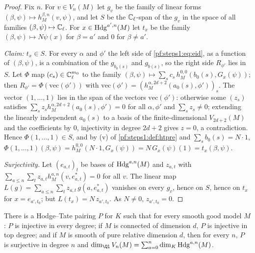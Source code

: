 \begin{proof}
Fix $n$. For $v\in V_n(M)$ let $g_v$ be the family of linear forms $(\beta,\psi)\mapsto h_M^{\beta,n}(v,\psi)$, and let $S$ be
the $\mathbb{C}_\ell$-span of the $g_v$ in the space of all families $(\beta,\psi)\mapsto\mathbb{C}_\ell$. For $x\in\mathrm{Hdg}^{a',n}(M)$
let $t_x$ be the family $(\beta,\psi)\mapsto N\psi(x)$ for $\beta=a'$ and $0$ for $\beta\ne a'$.

\emph{Claim: $t_x\in S$.} For every $\alpha$ and $\phi'$ the left side of \eqref{pf:steps1:eq:eid}, as a function of
$(\beta,\psi)$, is a combination of the $g_{b_0(s)}$ and $g_{b(s)}$, so the right side $R_{\phi'}$ lies in $S$. Let $\Phi$ map
$(c_s)\in\mathbb{C}_\ell^{m_0}$ to the family $(\beta,\psi)\mapsto\sum_sc_s\,h_M^{0,0}(b_0(s),G_x(\psi))$; then
$R_{\phi'}=\Phi(\mathrm{vec}(\phi'))$ with $\mathrm{vec}(\phi')=(h_M^{\alpha,2d+2}(a_0(s),\phi'))_s$. The vector $(1,\dots,1)$ lies
in the span of the vectors $\mathrm{vec}(\phi')$: otherwise some $(z_s)$ satisfies $\sum_sz_sh_M^{\alpha,2d+2}(a_0(s),\phi')=0$ for
all $\alpha,\phi'$ and $\sum_sz_s\ne0$; extending the linearly independent $a_0(s)$ to a basis of the finite-dimensional
$V_{2d+2}(M)$ and the coefficients by $0$, injectivity in degree $2d+2$ gives $z=0$, a contradiction. Hence
$\Phi(1,\dots,1)\in S$, and by (v) of \cref{pf:steps1:def:htpre} and $\sum_sb_0(s)=N\cdot1$,
$\Phi(1,\dots,1)(\beta,\psi)=h_M^{0,0}(N\cdot1,G_x(\psi))=N\,G_x(\psi)(1)=t_x(\beta,\psi)$.

\emph{Surjectivity.} Let $(e_{a,t})_t$ be bases of $\mathrm{Hdg}^{a,n}(M)$ and $z_{a,t}$ with $\sum_{a\le n}\sum_tz_{a,t}
h_M^{a,n}(v,e^*_{a,t})=0$ for all $v$. The linear map $L(g)=\sum_{a\le n}\sum_tz_{a,t}\,g(a,e^*_{a,t})$ vanishes on every $g_v$,
hence on $S$, hence on $t_x$ for $x=e_{a',t_0}$; but $L(t_x)=N\,z_{a',t_0}$. As $N\ne0$, $z_{a',t_0}=0$.
\end{proof}

\begin{theorem}\label{pf:steps1:htbij}
There is a Hodge--Tate pairing $P$ for $K$ such that for every smooth good model $M$: $P$ is injective in every degree; if $M$ is
connected of dimension $d$, $P$ is injective in top degree; and if $M$ is smooth of pure relative dimension $d$, then for every
$n$, $P$ is surjective in degree $n$ and $\dim_{\Ql}V_n(M)=\sum_{a=0}^n\dim_K\stepsIHdg^{a,n}(M)$.
\end{theorem}

